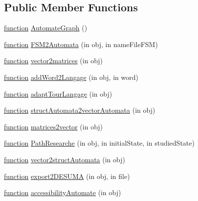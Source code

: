 \subsection*{Public Member Functions}
\begin{DoxyCompactItemize}
\item 
\hyperlink{_plan__desuma_functions_8m_ac2ffb26d6f42d3bbcd7847b0873403f4}{function} \hyperlink{class_automate_graph_aff151c681b4561197919d5820d1e1053}{Automate\+Graph} ()
\item 
\hyperlink{_plan__desuma_functions_8m_ac2ffb26d6f42d3bbcd7847b0873403f4}{function} \hyperlink{class_automate_graph_a9d58f1207ae9aba73d03bef475d47576}{F\+S\+M2\+Automata} (in obj, in name\+File\+F\+SM)
\item 
\hyperlink{_plan__desuma_functions_8m_ac2ffb26d6f42d3bbcd7847b0873403f4}{function} \hyperlink{class_automate_graph_a7fd73b5515afca80d5e86bbcac75b4c2}{vector2matrices} (in obj)
\item 
\hyperlink{_plan__desuma_functions_8m_ac2ffb26d6f42d3bbcd7847b0873403f4}{function} \hyperlink{class_automate_graph_ab22c8bf6e3defba441f651eed8cae19e}{add\+Word2\+Langage} (in obj, in word)
\item 
\hyperlink{_plan__desuma_functions_8m_ac2ffb26d6f42d3bbcd7847b0873403f4}{function} \hyperlink{class_automate_graph_a8e02a22fec54ff1401fe9118160274de}{adapt\+Tour\+Langage} (in obj)
\item 
\hyperlink{_plan__desuma_functions_8m_ac2ffb26d6f42d3bbcd7847b0873403f4}{function} \hyperlink{class_automate_graph_a3a9f9ebd72ecfd154977da272eb5a50c}{struct\+Automata2vector\+Automata} (in obj)
\item 
\hyperlink{_plan__desuma_functions_8m_ac2ffb26d6f42d3bbcd7847b0873403f4}{function} \hyperlink{class_automate_graph_a1d3dec7ebe07e4a18446dfafdc04c89d}{matrices2vector} (in obj)
\item 
\hyperlink{_plan__desuma_functions_8m_ac2ffb26d6f42d3bbcd7847b0873403f4}{function} \hyperlink{class_automate_graph_aa213172c8c114955cf1890a86a7cdd48}{Path\+Researche} (in obj, in initial\+State, in studied\+State)
\item 
\hyperlink{_plan__desuma_functions_8m_ac2ffb26d6f42d3bbcd7847b0873403f4}{function} \hyperlink{class_automate_graph_a956c136667dd61b62ed8aca48ba18ce3}{vector2struct\+Automata} (in obj)
\item 
\hyperlink{_plan__desuma_functions_8m_ac2ffb26d6f42d3bbcd7847b0873403f4}{function} \hyperlink{class_automate_graph_ad52b82012bbc9d8d246760f88fc78757}{export2\+D\+E\+S\+U\+MA} (in obj, in file)
\item 
\hyperlink{_plan__desuma_functions_8m_ac2ffb26d6f42d3bbcd7847b0873403f4}{function} \hyperlink{class_automate_graph_af2c974a8c1188f055e5661fd6a849f7a}{accessibility\+Automate} (in obj)
\end{DoxyCompactItemize}
